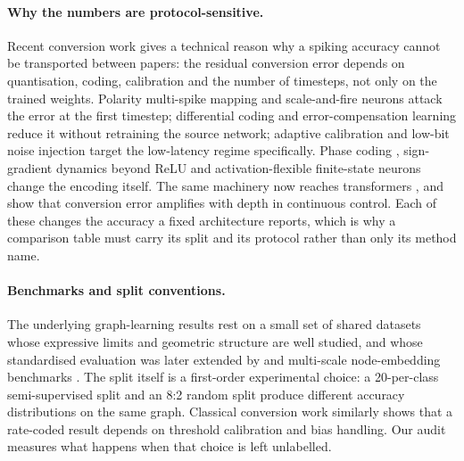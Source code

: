 \paragraph{Why the numbers are protocol-sensitive.} Recent conversion work gives a technical reason
why a spiking accuracy cannot be transported between papers: the residual conversion error depends
on quantisation, coding, calibration and the number of timesteps, not only on the trained weights.
Polarity multi-spike mapping \citep{zhang2025quantization} and scale-and-fire neurons
\citep{chen2025onetimestep} attack the error at the first timestep; differential coding
\citep{huang2025differential} and error-compensation learning \citep{liu2025errorcomp} reduce it
without retraining the source network; adaptive calibration \citep{wang2024adaptivecal} and low-bit
noise injection \citep{li2024noiseadaptor} target the low-latency regime specifically. Phase coding
\citep{hwang2024onespike}, sign-gradient dynamics beyond ReLU \citep{oh2024signgd} and
activation-flexible finite-state neurons \citep{jia2026activation} change the encoding itself. The
same machinery now reaches transformers \citep{huang2025spiketrans,wang2025trainingfree}, and
\citet{xu2026erroramp} show that conversion error amplifies with depth in continuous control. Each
of these changes the accuracy a fixed architecture reports, which is why a comparison table must
carry its split and its protocol rather than only its method name.

\paragraph{Benchmarks and split conventions.} The underlying graph-learning results rest on a small
set of shared datasets \citep{kipf2017semi,velickovic2018graph,hamilton2017inductive} whose
expressive limits \citep{xu2019powerful} and geometric structure \citep{pei2020geom} are well
studied, and whose standardised evaluation was later extended by \citet{hu2020open} and multi-scale
node-embedding benchmarks \citep{rozemberczki2021multi}. The split itself is a first-order
experimental choice: a 20-per-class semi-supervised split and an 8:2 random split produce different
accuracy distributions on the same graph. Classical conversion work
\citep{diehl2015fast,rueckauer2017conversion,sengupta2019going,bu2022optimal,deng2021optimal,
hao2023offset,wu2024ftbc,bojkovic2025temporal} similarly shows that a rate-coded result depends on
threshold calibration and bias handling. Our audit measures what happens when that choice is left
unlabelled.

